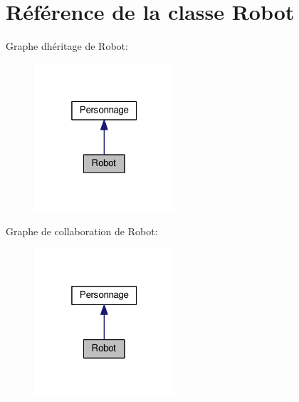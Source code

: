 \hypertarget{classRobot}{}\section{Référence de la classe Robot}
\label{classRobot}


Graphe d\textquotesingle{}héritage de Robot\+:
\nopagebreak
\begin{figure}[H]
\begin{center}
\leavevmode
\includegraphics[width=148pt]{classRobot__inherit__graph}
\end{center}
\end{figure}


Graphe de collaboration de Robot\+:
\nopagebreak
\begin{figure}[H]
\begin{center}
\leavevmode
\includegraphics[width=148pt]{classRobot__coll__graph}
\end{center}
\end{figure}
